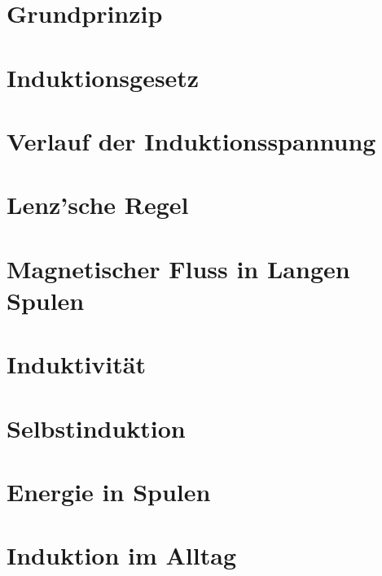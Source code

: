 \section{Grundprinzip}




\section{Induktionsgesetz}




\section{Verlauf der Induktionsspannung}




\section{Lenz'sche Regel}

 \label{sec:Lenz}


\section[Lange Spulen]{Magnetischer Fluss in Langen Spulen}




\section{Induktivität}




\section{Selbstinduktion}	\label{sec:Selbstinduktion}




\section{Energie in Spulen}								\label{sec:EnergieSpule}




\section{Induktion im Alltag}							\label{sec:Alltag}

